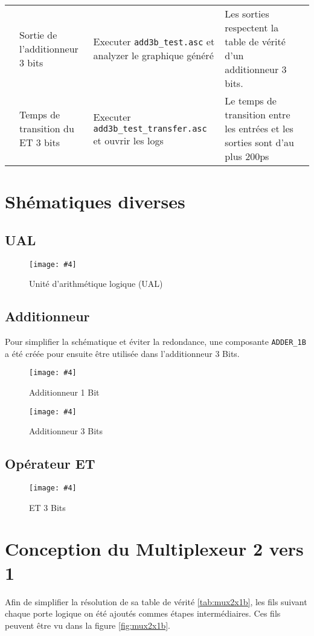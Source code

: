 \documentclass[a11paper]{article}
\newcommand{\quickfig}[4]{
\begin{figure}[H]
  \centering
  \texttt{[image: \#4]}
  \caption{#1}
  \label{fig:#2}
\end{figure}
}
\newcommand{\cbox}{\fbox{\phantom{\ding{51}}}}
\newcounter{tid}
\newcommand{\tid}{\stepcounter{tid}\thetid}
\begin{document}
\begin{center}
\begin{longtable}{lp{4cm}p{4cm}p{5cm}l}

    \tid &
    Sortie de l'additionneur 3 bits &
		Executer \verb|add3b_test.asc| et analyzer le graphique généré &
		Les sorties respectent la table de vérité d'un additionneur 3 bits. &
		\cbox \\

    \tid &
    Temps de transition du ET 3 bits &
		Executer \verb|add3b_test_transfer.asc| et ouvrir les logs &
		Le temps de transition entre les entrées et les sorties sont d'au plus 200ps &
		\cbox \\


	\end{longtable}
\end{center}

\section{Shématiques diverses}
\label{appdx:schematics}

\subsection{UAL}
\quickfig{Unité d'arithmétique logique (UAL)}{alu}{1}{assets/alu.png}

\newpage
\subsection{Additionneur}
Pour simplifier la schématique et éviter la redondance, une composante
\verb|ADDER_1B| a été créée pour ensuite être utilisée dans l'additionneur
3 Bits.

\quickfig{Additionneur 1 Bit}{add1b}{1}{assets/add1b.png}
\quickfig{Additionneur 3 Bits}{add3b}{.4}{assets/add3b.png}

\newpage
\subsection{Opérateur ET}
\quickfig{ET 3 Bits}{and3b}{1}{assets/and3b.png}


\newpage
\section{Conception du Multiplexeur 2 vers 1}

Afin de simplifier la résolution de sa table de vérité \ref{tab:mux2x1b}, les
fils suivant chaque porte logique on été ajoutés commes étapes intermédiaires.
Ces fils peuvent être vu dans la figure \ref{fig:mux2x1b}.
\end{document}
